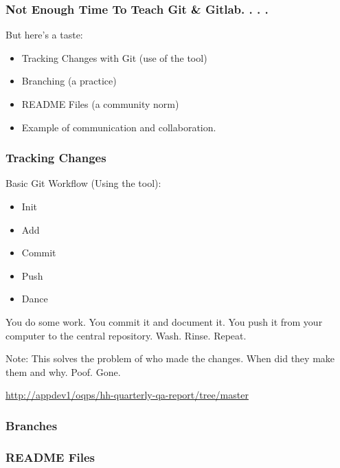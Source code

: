 \documentclass{beamer}
\begin{document}
\begin{frame} %
  \frametitle{Not Enough Time To Teach Git \& Gitlab. . . . }
  But here's a taste:
  \bigskip

  \begin{itemize}
  \item Tracking Changes with Git (use of the tool)
  \item Branching (a practice)
  \item README Files (a community norm)
  \item Example of communication and collaboration.
  \end{itemize}
\end{frame}

\begin{frame} %
  \frametitle{Tracking Changes}

  Basic Git Workflow (Using the tool):
  \bigskip

  \begin{itemize}
  \item Init
  \item Add
  \item Commit
  \item Push
  \item Dance
  \end{itemize}

  \bigskip
  You do some work. You commit it and document it. You push it from
  your computer to the central repository. Wash. Rinse. Repeat.

  Note: This solves the problem of who made the changes. When did they make
  them and why. Poof. Gone.
  
  {\tiny {\url{http://appdev1/oqps/hh-quarterly-qa-report/tree/master}}}
  
\end{frame}

\begin{frame} %
  \frametitle{Branches}
  
\end{frame}

\begin{frame} %
  \frametitle{README Files}
  
\end{frame}
\end{document}
